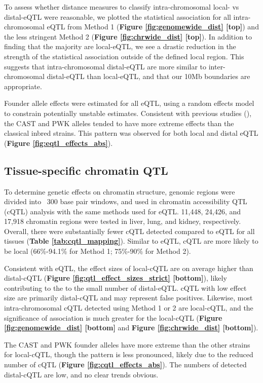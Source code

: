 To assess whether distance measures to classify intra-chromosomal local- vs distal-eQTL were reasonable, we plotted the statistical association for all intra-chromosomal eQTL from Method 1 (\textbf{Figure \ref{fig:genomewide_dist} [top]}) and the less stringent Method 2 (\textbf{Figure \ref{fig:chrwide_dist} [top]}). In addition to finding that the majority are local-eQTL, we see a drastic reduction in the strength of the statistical association outside of the defined local region. This suggests that intra-chromosomal distal-eQTL are more similar to inter-chromosomal distal-eQTL than local-eQTL, and that our 10Mb boundaries are appropriate. 

Founder allele effects were estimated for all eQTL, using a random effects model to constrain potentially unstable estimates. Consistent with previous studies (\eg \citealt{Aylor2011}), the CAST and PWK alleles tended to have more extreme effects than the classical inbred strains. This pattern was observed for both local and distal eQTL (\textbf{Figure \ref{fig:eqtl_effects_abs}}).

\subsection{Tissue-specific chromatin QTL}

To determine genetic effects on chromatin structure, genomic regions were divided into ~300 base pair windows, and used in chromatin accessibility QTL (cQTL) analysis with the same methods used for eQTL. 11,448, 24,426, and 17,918 chromatin regions were tested in liver, lung, and kidney, respectively. Overall, there were substantially fewer cQTL detected compared to eQTL for all tissues (\textbf{Table \ref{tab:cqtl_mapping}}). Similar to eQTL, cQTL are more likely to be local (66\%-94.1\% for Method 1; 75\%-90\% for Method 2).

Consistent with eQTL, the effect sizes of local-cQTL are on average higher than distal-cQTL (\textbf{Figure \ref{fig:qtl_effect_sizes_strict} [bottom]}), likely contributing to the to the small number of distal-eQTL. cQTL with low effect size are primarily distal-cQTL and may represent false positives. Likewise, most intra-chromosomal cQTL detected using Method 1 or 2 are local-cQTL, and the significance of association is much greater for the local-cQTL  (\textbf{Figure \ref{fig:genomewide_dist} [bottom]} and \textbf{Figure \ref{fig:chrwide_dist} [bottom]}).

The CAST and PWK founder alleles have more extreme than the other strains for local-cQTL, though the pattern is less pronounced, likely due to the reduced number of cQTL (\textbf{Figure \ref{fig:cqtl_effects_abs}}). The numbers of detected distal-cQTL are low, and no clear trends obvious.


